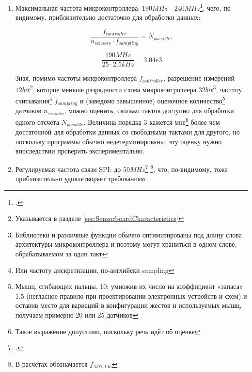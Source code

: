 \documentclass[a4paper, 10pt, final]{article} %
\begin{document}
    \begin{enumerate}[label=\emph{(\arabic*)}]
        \item Максимальная частота микроконтроллера: $190MHz$ - $240MHz$\footcite[раздел 1.4.1]{ESP32:Datasheet}, чего, по-видимому, приблизительно достаточно для обработки данных:
            \begin{figure}[H]
                \centering
                \begin{minipage}[b]{.35\linewidth}
                    \centering
                    \[
                        \frac{f_{controller}}{n_{sensors} \cdot f_{sampling}} = N_{possible} \mathrm{,}
                    \]
                \end{minipage}
                \begin{minipage}[b]{.35\linewidth}
                    \centering
                    \[
                        \frac{190MHz}{25 \cdot 2.5kHz} = 3.04\mathrm{e}3
                    \]
                \end{minipage}
            \end{figure}
            \noindent Зная, помимо частоты микроконтроллера $f_{controller}$, разрешение измерений $12bit$\footnote{Указывается в разделе \ref{sec:SensorboardCharacteristics}}, которое меньше разрядности слова микроконтроллера $32bit$\footnote{Библиотеки и различные функции обычно оптимизированы под длину слова архитектуры микроконтроллера и поэтому могут храниться в одном слове, обрабатываемом за один такт}, частоту считывания\footnote{Или частоту дискретизации, по-английски sampling} $f_{sampling}$ и (заведомо завышенное) оценочное количество\footnote{Мышц, сгибающих пальцы, 10; умножив их число на коэффициент «запаса» $1.5$ (негласное правило при проектировании электронных устройств и схем) и оставив место для вариаций в конфигурации жестов и используемых мышц, получаем примерно 20 или 25 датчиков} датчиков $n_{sensors}$, можно оценить, сколько тактов доступно для обработки одного отсчёта $N_{possible}$.
            Величина порядка $3$ кажется мне\footnote{Такое выражение допустимо, поскольку речь идёт об оценке} более чем достаточной для обработки данных со свободными тактами для другого, но поскольку программы обычно недетерминированы, эту оценку нужно впоследствии проверить экспериментально.
            \label{est:ControllerSpeed}
        \item Регулируемая частота связи SPI: до $50MHz$\footcite[раздел 4.1.9]{ESP32:Datasheet} \footnote{В расчётах обозначается $f_{MSCLK}$}, что, по-видимому, тоже приблизительно удовлетворяет требованиям:

\end{enumerate}
\end{document}
